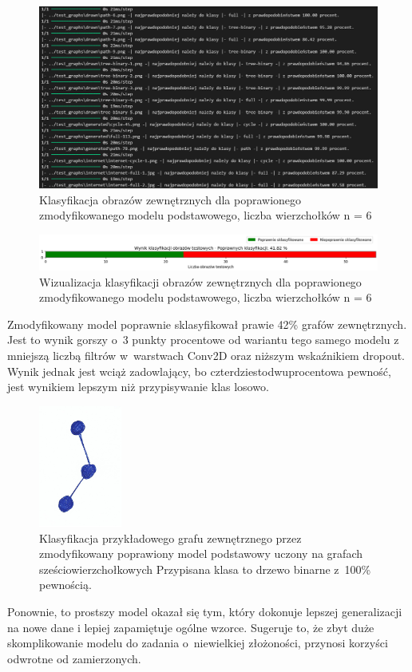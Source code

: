 \begin{figure}[ht]
	\centering
	\includegraphics[width=15.5cm]{resources/tests/images/v4/base6_1_1_txt.png}
	\caption{Klasyfikacja obrazów zewnętrznych dla poprawionego zmodyfikowanego modelu podstawowego, liczba wierzchołków n = 6}
	\label{Fig:tests-best-2b}
\end{figure}
\FloatBarrier

\begin{figure}[ht]
	\centering
	\includegraphics[width=15.5cm]{resources/tests/images/v4/base6_1_1_bar.png}
	\caption{Wizualizacja klasyfikacji obrazów zewnętrznych dla poprawionego zmodyfikowanego modelu podstawowego, liczba wierzchołków n = 6}
	\label{Fig:tests-best-1c}
\end{figure}
\FloatBarrier

Zmodyfikowany model poprawnie sklasyfikował prawie 42\% grafów zewnętrznych.
Jest to wynik gorszy o~3 punkty procentowe od wariantu tego samego modelu
z mniejszą liczbą filtrów w~warstwach Conv2D oraz niższym wskaźnikiem dropout.
Wynik jednak jest wciąż zadowlający, bo czterdziestodwuprocentowa pewność,
jest wynikiem lepszym niż przypisywanie klas losowo.

\begin{figure}[ht]
	\centering
	\includegraphics[height=4cm]{../graph_classification/test_graphs/drawn/path-4.png}
	\caption{Klasyfikacja przykładowego grafu zewnętrznego przez zmodyfikowany poprawiony model podstawowy
		uczony na grafach sześciowierzchołkowych
		Przypisana klasa to drzewo binarne z~100\% pewnością.}
	\label{Fig:tests-best-1d}
\end{figure}
\FloatBarrier

Ponownie, to prostszy model okazał się tym, który dokonuje lepszej generalizacji na nowe dane
i lepiej zapamiętuje ogólne wzorce.
Sugeruje to, że zbyt duże skomplikowanie modelu do zadania o~niewielkiej złożoności,
przynosi korzyści odwrotne od zamierzonych.